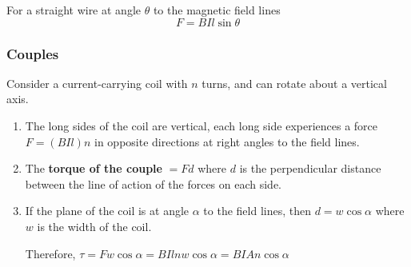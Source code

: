 For a straight wire at angle $\theta$ to the magnetic field lines
$$F=BIl\sin\theta$$

\subsubsection*{Couples}

Consider a current-carrying coil with $n$ turns, and can rotate about a vertical axis.
\begin{enumerate}
    \item The long sides of the coil are vertical, each long side experiences a force
        $F=(BIl)n$ in opposite directions at right angles to the field lines.
    \item The \textbf{torque of the couple} $=Fd$ where $d$ is the perpendicular distance between the line of action of the forces on each side.
    \item If the plane of the coil is at angle $\alpha$ to the field lines, then $d=w\cos\alpha$ where $w$ is the width of the coil.

        Therefore, $\tau=Fw\cos\alpha=BIlnw\cos\alpha=BIAn\cos\alpha$
\end{enumerate}
